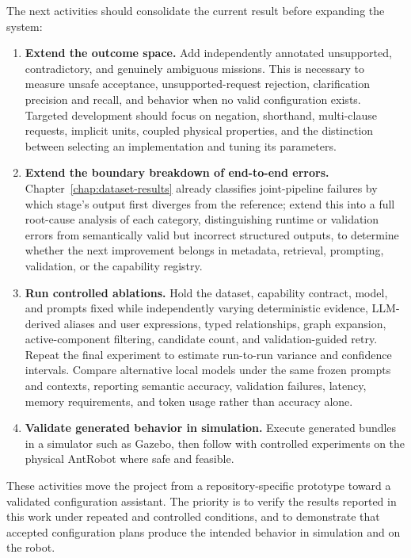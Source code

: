 The next activities should consolidate the current result before expanding the system:
\begin{enumerate}
    \item \textbf{Extend the outcome space.} Add independently annotated unsupported, contradictory, and genuinely ambiguous missions. This is necessary to measure unsafe acceptance, unsupported-request rejection, clarification precision and recall, and behavior when no valid configuration exists. Targeted development should focus on negation, shorthand, multi-clause requests, implicit units, coupled physical properties, and the distinction between selecting an implementation and tuning its parameters.

    \item \textbf{Extend the boundary breakdown of end-to-end errors.} Chapter~\ref{chap:dataset-results} already classifies joint-pipeline failures by which stage's output first diverges from the reference; extend this into a full root-cause analysis of each category, distinguishing runtime or validation errors from semantically valid but incorrect structured outputs, to determine whether the next improvement belongs in metadata, retrieval, prompting, validation, or the capability registry.

    \item \textbf{Run controlled ablations.} Hold the dataset, capability contract, model, and prompts fixed while independently varying deterministic evidence, LLM-derived aliases and user expressions, typed relationships, graph expansion, active-component filtering, candidate count, and validation-guided retry. Repeat the final experiment to estimate run-to-run variance and confidence intervals. Compare alternative local models under the same frozen prompts and contexts, reporting semantic accuracy, validation failures, latency, memory requirements, and token usage rather than accuracy alone.

    \item \textbf{Validate generated behavior in simulation.} Execute generated bundles in a simulator such as Gazebo, then follow with controlled experiments on the physical AntRobot where safe and feasible.
\end{enumerate}

These activities move the project from a repository-specific prototype toward a validated configuration assistant. The priority is to verify the results reported in this work under repeated and controlled conditions, and to demonstrate that accepted configuration plans produce the intended behavior in simulation and on the robot.
